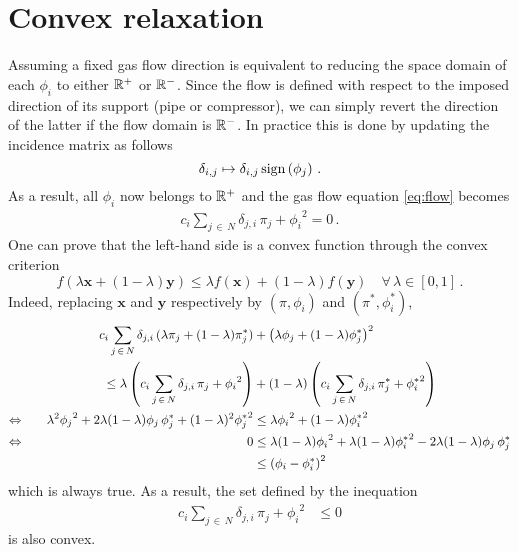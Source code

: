 \documentclass[a4paper, 12pt]{article}
\begin{document}
\section{Convex relaxation} \label{sec:convex}

Assuming a fixed gas flow direction is equivalent to reducing the space domain of each $\phi_i$ to either $\mathbb{R}^+$ or $\mathbb{R}^-$. Since the flow is defined with respect to the imposed direction of its support (pipe or compressor), we can simply revert the direction of the latter if the flow domain is $\mathbb{R}^-$. In practice this is done by updating the incidence matrix as follows
$$\delta_{i, j} \mapsto \delta_{i, j} \, \mathrm{sign}\left(\phi_j\right) \, .$$ 
As a result, all $\phi_i$ now belongs to $\mathbb{R}^+$ and the gas flow equation \eqref{eq:flow} becomes
\begin{align*}
    c_i \sum_{j \, \in \, N} \delta_{j, i} \, \pi_j + {\phi_i}^2 = 0 \, .
\end{align*}
One can prove that the left-hand side is a convex function through the convex criterion $$f(\lambda \bm{x} + (1 - \lambda) \bm{y}) \leq \lambda f(\bm{x}) + (1 - \lambda) f(\bm{y}) \quad \forall \, \lambda \in [0, 1] \, .$$ Indeed, replacing $\bm{x}$ and $\bm{y}$ respectively by $(\pi, \phi_i)$ and $(\pi^*, \phi_i^*)$,
\begin{alignat*}{2}
    && c_i \sum_{j \, \in \, N} \delta_{j, i} \, (\lambda \pi_j + (1 - \lambda) \pi_j^*) & + \left(\lambda \phi_j + (1 - \lambda) \phi_j^*\right)^2 \\
    && \leq \lambda \left(c_i \sum_{j \, \in \, N} \delta_{j, i} \, \pi_j + {\phi_i}^2\right) & + (1 - \lambda) \left(c_i \sum_{j \, \in \, N} \delta_{j, i} \, \pi_j^* + {\phi_i^*}^2\right) \\
    \Leftrightarrow \quad && \lambda^2 {\phi_j}^2 + 2 \lambda (1 - \lambda) \phi_j \, \phi_j^* + (1 - \lambda)^2 {\phi_j^*}^2 & \leq \lambda {\phi_i}^2 + (1 - \lambda) {\phi_i^*}^2 \\
    \Leftrightarrow \quad && 0 & \leq \lambda (1 - \lambda) {\phi_i}^2 + \lambda (1 - \lambda) {\phi_i^*}^2 - 2 \lambda (1 - \lambda) \phi_j \, \phi_j^* \\
    && & \leq \left(\phi_i - \phi_i^*\right)^2
\end{alignat*}
which is always true. As a result, the set defined by the inequation
\begin{align}
    c_i \sum_{j \, \in \, N} \delta_{j, i} \, \pi_j + {\phi_i}^2 & \leq 0 \label{eq:convex_relax}
\end{align}
is also convex.
\end{document}
